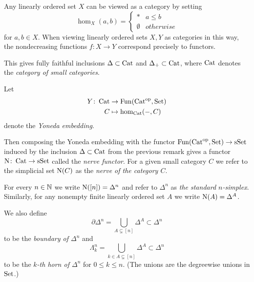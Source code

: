 \begin{remark}\label{rmk:linOrderedAsCat}
    Any linearly ordered set $X$ can be viewed as a category by setting
    \begin{equation*}
        \hom_{X}(a,b)=\begin{cases}
            * & a\leq b\\
            \emptyset & otherwise
        \end{cases}
    \end{equation*}
    for $a,b\in X$.
    When viewing linearly ordered sets $X,Y$ as categories in this way, the nondecreasing functions $f\colon X\to Y$ correspond precisely to functors.

    This gives fully faithful inclusions $\Delta\subset\operatorname{Cat}$ and $\Delta_+\subset\operatorname{Cat}$, where $\operatorname{Cat}$ denotes the \emph{category of small categories}.
\end{remark}
\begin{definition} %
    Let
    \begin{align*}
        Y\colon\operatorname{Cat}&\to\operatorname{Fun}(\operatorname{Cat}^{\operatorname{op}},\operatorname{Set})\\
        C&\mapsto\hom_{\operatorname{Cat}}(-,C)
    \end{align*}
    denote the \emph{Yoneda embedding}.

    Then composing the Yoneda embedding with the functor $\operatorname{Fun}(\operatorname{Cat}^{\operatorname{op}},\operatorname{Set})\to\operatorname{sSet}$ induced by the inclusion $\Delta\subset\operatorname{Cat}$ from the previous remark gives a functor $\operatorname{N}\colon\operatorname{Cat}\to\operatorname{sSet}$ called the \emph{nerve functor}.
    For a given small category $C$ we refer to the simplicial set $\operatorname{N}(C)$ as the \emph{nerve of the category $C$}.
\end{definition}
\begin{definition}
    For every $n\in\mathbb{N}$ we write $\operatorname{N}([n])=\Delta^n$ and refer to $\Delta^n$ as \emph{the standard $n$-simplex}.
    Similarly, for any nonempty finite linearly ordered set $A$ we write $\operatorname{N}(A)=\Delta^A$.

    We also define 
    \begin{equation*}
        \partial\Delta^n=\bigcup\limits_{A\subsetneq[n]}\Delta^A\subset\Delta^n
    \end{equation*}
    to be the \emph{boundary of $\Delta^n$} and 
    \begin{equation*}
        \Lambda_k^n=\bigcup\limits_{k\in A\subsetneq[n]}\Delta^A\subset\Delta^n
    \end{equation*}
    to be the \emph{$k$-th horn of $\Delta^n$} for $0\leq k\leq n$.
    (The unions are the degreewise unions in $\operatorname{Set}$.) %
\end{definition}
